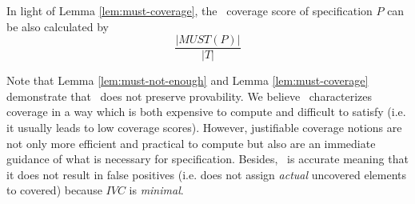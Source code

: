 In light of Lemma \ref{lem:must-coverage}, the \nondetcov\ coverage score of specification $P$ can be also calculated by
$$\frac{|MUST(P)|}{|T|}$$
\vspace{0.2in}


%
Note that Lemma \ref{lem:must-not-enough} and Lemma \ref{lem:must-coverage} demonstrate that \nondetcov\ does not preserve provability. We believe \nondetcov\ characterizes coverage in a way which is both expensive to compute and difficult to satisfy (i.e. it usually leads to low coverage scores). However, justifiable coverage notions are not only more efficient and practical to compute but also are an immediate guidance of what is necessary for specification.
Besides, \ivccov\ is accurate meaning that it does not result in false positives (i.e. does not assign \emph{actual} uncovered elements to covered) because $IVC$ is \emph{minimal}.




